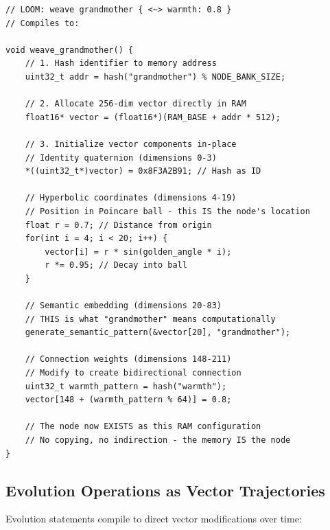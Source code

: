 \documentclass[12pt,a4paper,openany]{book} %
\begin{document}
\vspace{0.5em}
\begin{lstlisting}[style=cpp]
// LOOM: weave grandmother { <~> warmth: 0.8 }
// Compiles to:

void weave_grandmother() {
    // 1. Hash identifier to memory address
    uint32_t addr = hash("grandmother") % NODE_BANK_SIZE;

    // 2. Allocate 256-dim vector directly in RAM
    float16* vector = (float16*)(RAM_BASE + addr * 512);

    // 3. Initialize vector components in-place
    // Identity quaternion (dimensions 0-3)
    *((uint32_t*)vector) = 0x8F3A2B91; // Hash as ID

    // Hyperbolic coordinates (dimensions 4-19)
    // Position in Poincare ball - this IS the node's location
    float r = 0.7; // Distance from origin
    for(int i = 4; i < 20; i++) {
        vector[i] = r * sin(golden_angle * i);
        r *= 0.95; // Decay into ball
    }

    // Semantic embedding (dimensions 20-83)
    // THIS is what "grandmother" means computationally
    generate_semantic_pattern(&vector[20], "grandmother");

    // Connection weights (dimensions 148-211)
    // Modify to create bidirectional connection
    uint32_t warmth_pattern = hash("warmth");
    vector[148 + (warmth_pattern % 64)] = 0.8;

    // The node now EXISTS as this RAM configuration
    // No copying, no indirection - the memory IS the node
}
\end{lstlisting}
\vspace{0.5em}

\subsection{Evolution Operations as Vector Trajectories}

Evolution statements compile to direct vector modifications over time:
\end{document}
